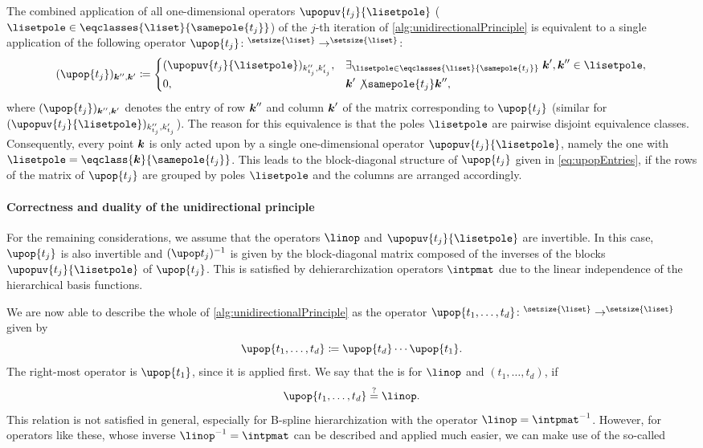 The combined application of all one-di\-men\-sional operators
$\upopuv{t_j}{\lisetpole}$
($\lisetpole \in \eqclasses{\liset}{\samepole{t_j}}$)
of the $j$-th iteration of \cref{alg:unidirectionalPrinciple}
is equivalent to a single application of the following operator
$\upop{t_j}\colon \real^{\setsize{\liset}} \to \real^{\setsize{\liset}}$:
\begin{equation}
  \label{eq:upopEntries}
  (\upop{t_j})_{\*k'',\*k'}
  \ceq
  \begin{cases}
    (\upopuv{t_j}{\lisetpole})_{k''_{t_j},k'_{t_j}},&
    \ex{\lisetpole \in \eqclasses{\liset}{\samepole{t_j}}}{
      \*k', \*k'' \in \lisetpole
    },\\
    0,&\*k' \not\samepole{t_j} \*k'',
  \end{cases}
\end{equation}
where $(\upop{t_j})_{\*k'',\*k'}$ denotes the entry of row ${\boldsymbol{k}}''$
and column ${\boldsymbol{k}}'$ of the matrix corresponding to $\upop{t_j}$
(similar for $(\upopuv{t_j}{\lisetpole})_{k''_{t_j},k'_{t_j}}$).
The reason for this equivalence is that
the poles $\lisetpole$ are pairwise disjoint equivalence classes.
Consequently, every point ${\boldsymbol{k}}$ is only acted upon by a single
one-dimensional operator $\upopuv{t_j}{\lisetpole}$,
namely the one with $\lisetpole = \eqclass{\*k}{\samepole{t_j}}$.
This leads to the block-diagonal structure
of $\upop{t_j}$ given in \eqref{eq:upopEntries},
if the rows of the matrix of $\upop{t_j}$
are grouped by poles $\lisetpole$ and the columns are arranged accordingly.

\paragraph{Correctness and duality of the unidirectional principle}

For the remaining considerations, we assume that
the operators $\linop$ and $\upopuv{t_j}{\lisetpole}$ are invertible.
In this case, $\upop{t_j}$ is also invertible and
$\upopinv{t_j}$ is given by the block-diagonal matrix composed of
the inverses of the blocks $\upopuv{t_j}{\lisetpole}$ of $\upop{t_j}$.
This is satisfied by dehierarchization operators $\intpmat$ due to the
linear independence of the hierarchical basis functions.

We are now able to describe the whole \up of
\cref{alg:unidirectionalPrinciple} as the operator
$\upop{t_1,\dotsc,t_d}\colon \real^{\setsize{\liset}} \to
\real^{\setsize{\liset}}$ given by
\begin{equation}
  \label{eq:upopProduct}
  \upop{t_1,\dotsc,t_d}
  \ceq \upop{t_d} \dotsm \upop{t_1}.
\end{equation}
The right-most operator is $\upop{t_1}$, since it is applied first.
We say that the \up is  for $\linop$ and
$(t_1, \dotsc, t_d)$, if
\begin{equation}
  \upop{t_1,\dotsc,t_d}
  \overset{?}{=} \linop.
\end{equation}
This relation is not satisfied in general,
especially for B-spline hierarchization with the operator
$\linop = \intpmatinv$.
However, for operators like these, whose inverse
$\linopinv = \intpmat$ can be described and applied much easier,
we can make use of the so-called 


